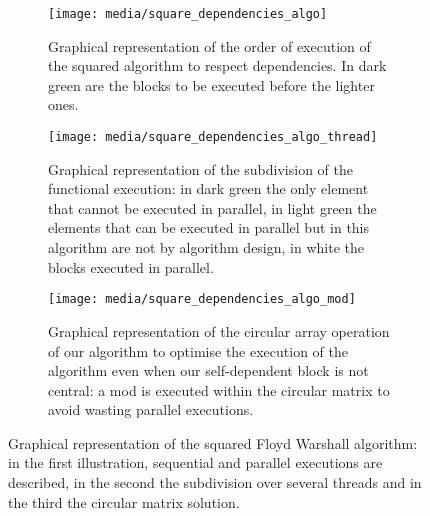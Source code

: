 \begin{figure}[htbp]
    \centering
    \begin{subfigure}[t]{0.3\textwidth}
        \texttt{[image: media/square\_dependencies\_algo]}
        
        \caption{Graphical representation of the order of execution of the squared algorithm to respect dependencies. In dark green are the blocks to be executed before the lighter ones.}
        \label{fig:square-dependecies-algo}
    \end{subfigure}
    \begin{subfigure}[t]{0.3\textwidth}
        \texttt{[image: media/square\_dependencies\_algo\_thread]}
        
        \caption{Graphical representation of the subdivision of the functional execution: in dark green the only element that cannot be executed in parallel, in light green the elements that can be executed in parallel but in this algorithm are not by algorithm design, in white the blocks executed in parallel.}
        \label{fig:square-dependecies-thread}
    \end{subfigure}
    \begin{subfigure}[t]{0.3\textwidth}
        \texttt{[image: media/square\_dependencies\_algo\_mod]}
        
        \caption{Graphical representation of the circular array operation of our algorithm to optimise the execution of the algorithm even when our self-dependent block is not central: a mod is executed within the circular matrix to avoid wasting parallel executions.}
        \label{fig:square-dependecies-circular}
    \end{subfigure}
    \caption{Graphical representation of the squared Floyd Warshall algorithm: in the first illustration, sequential and parallel executions are described, in the second the subdivision over several threads and in the third the circular matrix solution.}
        \label{fig:square-algo}
\end{figure}

\FloatBarrier